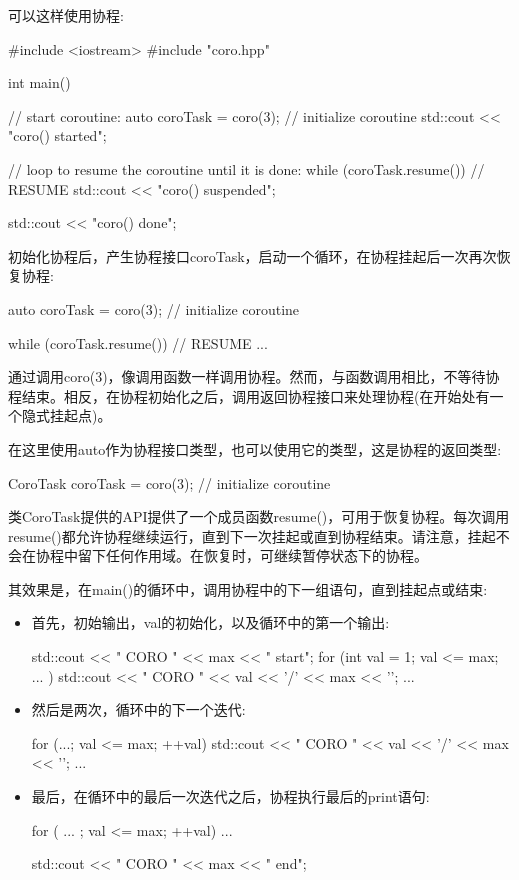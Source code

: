 
可以这样使用协程:


\begin{cpp}
#include <iostream>
#include "coro.hpp"

int main()
{
	// start coroutine:
	auto coroTask = coro(3); // initialize coroutine
	std::cout << "coro() started\n";

	// loop to resume the coroutine until it is done:
	while (coroTask.resume()) { // RESUME
		std::cout << "coro() suspended\n";
	}

	std::cout << "coro() done\n";
}
\end{cpp}

初始化协程后，产生协程接口coroTask，启动一个循环，在协程挂起后一次再次恢复协程:

\begin{cpp}
auto coroTask = coro(3); // initialize coroutine

while (coroTask.resume()) { // RESUME
	...
}
\end{cpp}

通过调用coro(3)，像调用函数一样调用协程。然而，与函数调用相比，不等待协程结束。相反，在协程初始化之后，调用返回协程接口来处理协程(在开始处有一个隐式挂起点)。

在这里使用auto作为协程接口类型，也可以使用它的类型，这是协程的返回类型:

\begin{cpp}
CoroTask coroTask = coro(3); // initialize coroutine
\end{cpp}

类CoroTask提供的API提供了一个成员函数resume()，可用于恢复协程。每次调用resume()都允许协程继续运行，直到下一次挂起或直到协程结束。请注意，挂起不会在协程中留下任何作用域。在恢复时，可继续暂停状态下的协程。

其效果是，在main()的循环中，调用协程中的下一组语句，直到挂起点或结束:

\begin{itemize}
\item
首先，初始输出，val的初始化，以及循环中的第一个输出:

\begin{cpp}
std::cout << "                 CORO " << max << " start\n";
for (int val = 1; val <= max; ... ) {
	std::cout << "               CORO " << val << '/' << max << '\n';
	...
}
\end{cpp}

\item
然后是两次，循环中的下一个迭代:

\begin{cpp}
	for (...; val <= max; ++val) {
		std::cout << "               CORO " << val << '/' << max << '\n';
		...
	}
\end{cpp}

\item
最后，在循环中的最后一次迭代之后，协程执行最后的print语句:

\begin{cpp}
for ( ... ; val <= max; ++val) {
	...
}

std::cout << " CORO " << max << " end\n";
\end{cpp}
\end{itemize}

